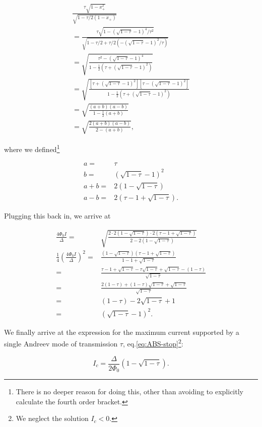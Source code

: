 \begin{eqnarray}
\frac{\tau\sqrt{1-x_{+}^2}}{\sqrt{1-\tau/2(1-x_{+})}} \\
= \frac{ \tau\sqrt{1-(\sqrt{1-\tau}-1)^4/\tau^2} }{ \sqrt{1-\tau/2+\tau/2(-(\sqrt{1-\tau}-1)^2/\tau)} } \\
	= \sqrt{ \frac{ \tau^2-(\sqrt{1-\tau}-1)^4 }{ 1-\frac{1}{2} \left( \tau+(\sqrt{1-\tau}-1)^2 \right) } } \\
	= \sqrt{ \frac{ \left\lbrack \tau+(\sqrt{1-\tau}-1)^2 \right\rbrack \left\lbrack \tau-(\sqrt{1-\tau}-1)^2 \right\rbrack }{ 1-\frac{1}{2} \left( \tau+(\sqrt{1-\tau}-1)^2 \right) } } \\
	= \sqrt{\frac{(a+b)(a-b)}{1-\frac{1}{2}(a+b)}} \\ 
	= \sqrt{\frac{2(a+b)(a-b)}{2-(a+b)}},
\end{eqnarray}

where we defined\footnote{There is no deeper reason for doing this, other than avoiding to explicitly calculate the fourth order bracket.}

\begin{eqnarray}
a =& \tau \\
b =& (\sqrt{1-\tau}-1)^2 \\
a+b =& 2(1-\sqrt{1-\tau}) \\
a-b =& 2(\tau-1+\sqrt{1-\tau}).
\end{eqnarray}

Plugging this back in, we arrive at

\begin{eqnarray}
\frac{4\Phi_0I}{\Delta} =& \sqrt{ \frac{ 2\cdot2(1-\sqrt{1-\tau}) \cdot 2(\tau-1+\sqrt{1-\tau}) }{ 2-2(1-\sqrt{1-\tau}) } } \\
\frac{1}{4}\left( \frac{4\Phi_0I}{\Delta} \right)^2 =& \frac{ (1-\sqrt{1-\tau})(\tau-1+\sqrt{1-\tau}) }{ 1-1+\sqrt{1-\tau} } \\
=& \frac{\tau-1+\sqrt{1-\tau}-\tau\sqrt{1-\tau}+\sqrt{1-\tau}-(1-\tau)}{\sqrt{1-\tau}} \\
=& \frac{2(1-\tau)+(1-\tau)\sqrt{1-\tau}+\sqrt{1-\tau}}{\sqrt{1-\tau}} \\
=& (1-\tau)-2\sqrt{1-\tau}+1 \\
=& (\sqrt{1-\tau}-1)^2.
\end{eqnarray}

We finally arrive at the expression for the maximum current supported by a single Andreev mode of transmission $\tau$, eq.\ref{eq:ABS-stop}\footnote{We neglect the solution $I_c<0$.}:

\begin{equation}
I_c=\frac{\Delta}{2\Phi_0} \left( 1-\sqrt{1-\tau} \right).
\end{equation}


